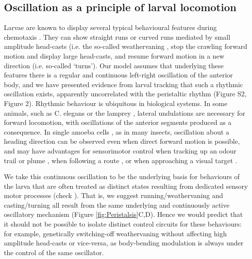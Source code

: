 \documentclass[11pt,a4paper]{article}
\newcommand{\todoBW}[1]{\todo[author=BW,color=orange, size=\tiny,inline]{#1}}
\begin{document}
\subsection{Oscillation as a principle of larval locomotion}
Larvae are known to display several typical behavioural features during chemotaxis \citep{green1983organization,cobbwhatandhow1999,gomez2012active}. They can show straight runs or curved runs mediated by small amplitude head-casts (i.e. the so-called weathervaning \citep{iino2009parallel,ohashi2014novel,gomez2014multilevel}, stop the crawling forward motion and display large head-casts, and resume forward motion in a new direction (i.e. so-called ‘turns’). Our model assumes that underlying these features there is a regular and continuous left-right oscillation of the anterior body, and we have presented evidence from larval tracking that such a rhythmic oscillation exists, apparently uncorrelated with the peristaltic rhythm (Figure S2, Figure 2). Rhythmic behaviour is ubiquitous in biological systems. In some animals, such as C. elegans \citep{iino2009parallel,izquierdo2010evolution,lockery2011computational}  or the lamprey \citep{lansner1997realistic,wilson1999spikes}, lateral undulations are necessary for forward locomotion, with oscillations of the anterior segments produced as a consequence. In single amoeba cells \citep{yangzigzag2011}, as in many insects, oscillation about a heading direction can be observed even when direct forward motion is possible, and may have advantages for sensorimotor control when tracking up an odour trail \citep{hangartner1969structure} or plume \citep{budick2006free,belanger1996centrally,willis1997centrally,willis2008effects,carde2008navigational}  , when following a route \citep{lent2010image,kodzhabashev2015route}, or when approaching a visual target \citep{wallace1962experiments,philippides2013bumblebee,voss1998active}.

We take this continuous oscillation to be the underlying basis for behaviours of the larva that are often treated as distinct states resulting from dedicated sensory motor processes (check \cite{vogelstein2014discovery,green1983organization,cobbwhatandhow1999,gomez2012active,gomez2014multilevel,hernandez2015reverse,gepner2015computations}  ). That is, we suggest running/weathervaning and casting/turning all result from the same underlying and continuously active oscillatory mechanism (Figure \ref{fig:Peristalsis}C,D). Hence we would predict that it should not be possible to isolate distinct control circuits for these behaviours: for example, genetically switching-off weathervaning without affecting high amplitude head-casts or vice-versa, as body-bending modulation is always under the control of the same oscillator. 
\end{document}
